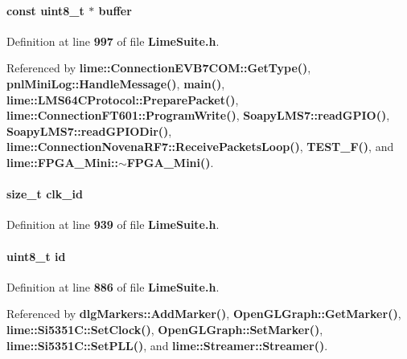 \paragraph[{buffer}]{\setlength{\rightskip}{0pt plus 5cm}const uint8\+\_\+t $\ast$ buffer}\label{group__FN__LOW__LVL_ga9e71a98856288ad285d7472959bc387e}


Definition at line {\bf 997} of file {\bf Lime\+Suite.\+h}.



Referenced by {\bf lime\+::\+Connection\+E\+V\+B7\+C\+O\+M\+::\+Get\+Type()}, {\bf pnl\+Mini\+Log\+::\+Handle\+Message()}, {\bf main()}, {\bf lime\+::\+L\+M\+S64\+C\+Protocol\+::\+Prepare\+Packet()}, {\bf lime\+::\+Connection\+F\+T601\+::\+Program\+Write()}, {\bf Soapy\+L\+M\+S7\+::read\+G\+P\+I\+O()}, {\bf Soapy\+L\+M\+S7\+::read\+G\+P\+I\+O\+Dir()}, {\bf lime\+::\+Connection\+Novena\+R\+F7\+::\+Receive\+Packets\+Loop()}, {\bf T\+E\+S\+T\+\_\+\+F()}, and {\bf lime\+::\+F\+P\+G\+A\+\_\+\+Mini\+::$\sim$\+F\+P\+G\+A\+\_\+\+Mini()}.

\paragraph[{clk\+\_\+id}]{\setlength{\rightskip}{0pt plus 5cm}size\+\_\+t clk\+\_\+id}\label{group__FN__LOW__LVL_ga41e94e558bfa441466772aae351e05c4}


Definition at line {\bf 939} of file {\bf Lime\+Suite.\+h}.

\paragraph[{id}]{\setlength{\rightskip}{0pt plus 5cm}uint8\+\_\+t id}\label{group__FN__LOW__LVL_ga1e6927fa1486224044e568f9c370519b}


Definition at line {\bf 886} of file {\bf Lime\+Suite.\+h}.



Referenced by {\bf dlg\+Markers\+::\+Add\+Marker()}, {\bf Open\+G\+L\+Graph\+::\+Get\+Marker()}, {\bf lime\+::\+Si5351\+C\+::\+Set\+Clock()}, {\bf Open\+G\+L\+Graph\+::\+Set\+Marker()}, {\bf lime\+::\+Si5351\+C\+::\+Set\+P\+L\+L()}, and {\bf lime\+::\+Streamer\+::\+Streamer()}.

